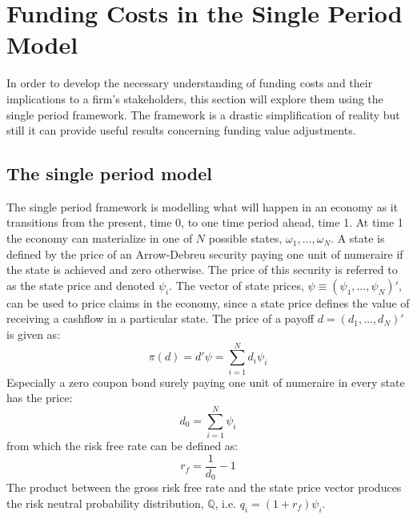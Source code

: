\documentclass[../main.tex]{subfiles}
\begin{document}
    \section{Funding Costs in the Single Period Model}
        In order to develop the necessary understanding of funding costs and their implications to a firm's stakeholders, this section will explore them using the single period framework. The framework is a drastic simplification of reality but still it can provide useful results concerning funding value adjustments.

    \subsection{The single period model}
        The single period framework is modelling what will happen in an economy as it transitions from the present, time 0, to one time period ahead, time 1. At time 1 the economy can materialize in one of $N$ possible states, $\omega_{1}, \dots, \omega_{N}$. A state is defined by the price of an Arrow-Debreu security paying one unit of numeraire if the state is achieved and zero otherwise. The price of this security is referred to as the state price and denoted $\psi_{i}$. The vector of state prices, $\psi \equiv \left(\psi_{1}, \dots, \psi_{N}\right)'$, can be used to price claims in the economy, since a state price defines the value of receiving a cashflow in a particular state. The price of a payoff $d=\left(d_{1}, \dots, d_{N}\right)'$ is given as:
            \begin{equation}
                \pi(d) = d'\psi = \sum_{i=1}^{N} d_{i}\psi_{i}
            \end{equation}
        Especially a zero coupon bond surely paying one unit of numeraire in every state has the price:
            \begin{equation}
                d_{0} = \sum_{i=1}^{N} \psi_{i}
            \end{equation}
        from which the risk free rate can be defined as:
            \begin{equation}
                r_{f} = \frac{1}{d_{0}} - 1
            \end{equation}
        The product between the gross risk free rate and the state price vector produces the risk neutral probability distribution, $\mathbb{Q}$, i.e. $q_{i} = (1 + r_{f})\psi_{i}$.
\end{document}
